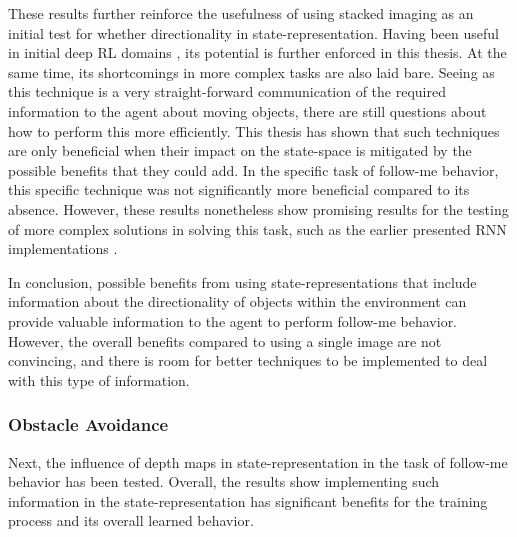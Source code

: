 These results further reinforce the usefulness of using stacked imaging as an 
initial test for whether directionality in state-representation. Having been useful 
in initial deep RL domains \cite{rlsolvingatari}, its potential is further 
enforced in this thesis. At the same time, its shortcomings in more complex tasks 
are also laid bare. Seeing as this technique is a very straight-forward communication 
of the required information to the agent about moving objects, there are still questions 
about how to perform this more efficiently. This thesis has shown that such techniques 
are only beneficial when their impact on the state-space is mitigated by the possible 
benefits that they could add. In the specific task of follow-me behavior, this specific 
technique was not significantly more beneficial compared to its absence. However, these 
results nonetheless show promising results for the 
testing of more complex solutions in solving this task, such as the earlier presented 
RNN implementations \cite{RLenLSTMfordrone, LSTMinRL}. 

In conclusion, possible benefits from using state-representations that 
include information about the directionality of objects within the environment 
can provide valuable information to the agent to perform follow-me behavior. 
However, the overall benefits compared to using a single image are not convincing, 
and there is room for better techniques to be implemented to deal with this type of 
information. 

\subsubsection{Obstacle Avoidance} 
Next, the influence of depth maps in state-representation in the task of 
follow-me behavior has been tested. Overall, the results show 
implementing such information in the state-representation has significant 
benefits for the training process and its overall learned behavior. 

